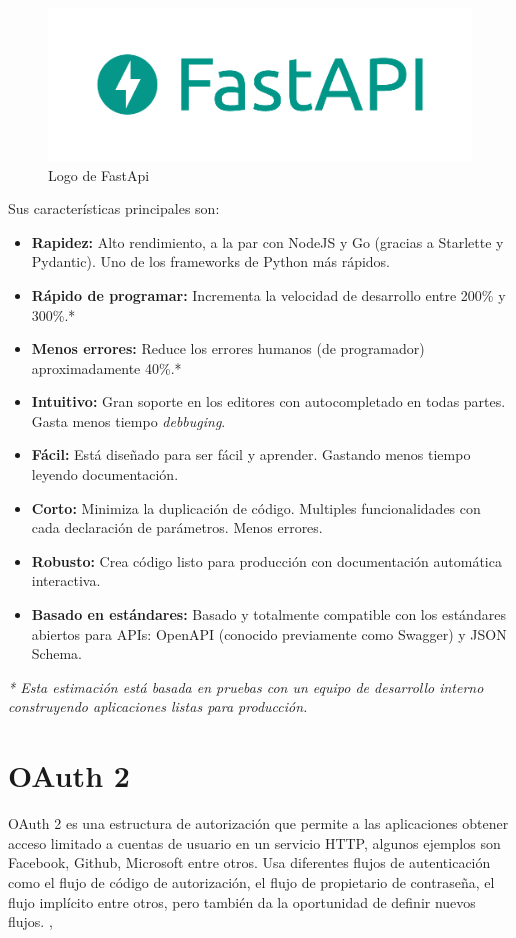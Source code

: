 \begin{figure}[!ht]
    \centering
    \includegraphics[scale=0.250]{TT/img/analisis/logofastapi.png}
    \caption{Logo de FastApi}
    \label{graphic:logoFastApi}
\end{figure}
Sus características principales son:
\begin{itemize}
    \item \textbf{Rapidez: }Alto rendimiento, a la par con NodeJS y Go (gracias a Starlette y Pydantic). Uno de los frameworks de Python más rápidos.
    \item \textbf{Rápido de programar: }Incrementa la velocidad de desarrollo entre 200\% y 300\%.*
    \item \textbf{Menos errores: }Reduce los errores humanos (de programador) aproximadamente 40\%.*
    \item \textbf{Intuitivo: }Gran soporte en los editores con autocompletado en todas partes. Gasta menos tiempo \textit{debbuging}.
    \item \textbf{Fácil: }Está diseñado para ser fácil y aprender. Gastando menos tiempo leyendo documentación.
    \item \textbf{Corto: }Minimiza la duplicación de código. Multiples funcionalidades con cada declaración de parámetros. Menos errores.
    \item \textbf{Robusto: }Crea código listo para producción con documentación automática interactiva.
    \item \textbf{Basado en estándares: }Basado y totalmente compatible con los estándares abiertos para APIs:  OpenAPI (conocido previamente como Swagger) y JSON Schema.
\end{itemize}

\textit{* Esta estimación está basada en pruebas con un equipo de desarrollo interno construyendo aplicaciones listas para producción.}

\section{OAuth 2}
OAuth 2 es una estructura de autorización que permite a las aplicaciones obtener acceso limitado a cuentas de usuario en un servicio HTTP, algunos ejemplos son Facebook, Github, Microsoft entre otros. Usa diferentes flujos de autenticación como el flujo de código de autorización, el flujo de propietario de contraseña, el flujo implícito entre otros, pero también da la oportunidad de definir nuevos flujos. \cite{Anicas2018}, \cite{Magana2020}

